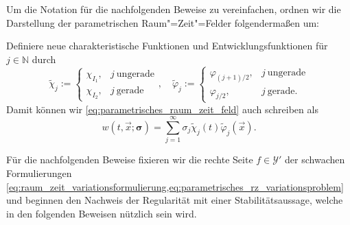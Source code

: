 Um die Notation für die nachfolgenden Beweise zu vereinfachen, ordnen wir die Darstellung der parametrischen Raum"=Zeit"=Felder folgendermaßen um:
\begin{Bemerkung}
    Definiere neue charakteristische Funktionen und Entwicklungsfunktionen für $j \in \mathbb{N}$ durch
    \begin{equation}
        \tilde{\chi}_{j} := \begin{cases}
            \chi_{I_{1}}, & j~\text{ungerade}\\
            \chi_{I_{2}}, & j~\text{gerade}
        \end{cases}, \quad
        \tilde{\varphi}_{j} := \begin{cases}
            \varphi_{(j+1)/{2}}, & j~\text{ungerade}\\
            \varphi_{j / 2}, & j~\text{gerade}.
        \end{cases}
    \end{equation}
    Damit können wir \cref{eq:parametrisches_raum_zeit_feld} auch schreiben als
    \begin{equation}
        w(t, \vec{x}; \bm \sigma) = \sum_{j = 1}^{\infty} \sigma_{j} \tilde{\chi}_{j}(t) \tilde{\varphi}_{j}(\vec{x}).
    \end{equation}
\end{Bemerkung}

Für die nachfolgenden Beweise fixieren wir die rechte Seite $f \in \mathcal Y'$ der schwachen Formulierungen \cref{eq:raum_zeit_variationsformulierung,eq:parametrisches_rz_variationsproblem} und beginnen den Nachweis der Regularität mit einer Stabilitätsaussage, welche in den folgenden Beweisen nützlich sein wird.

